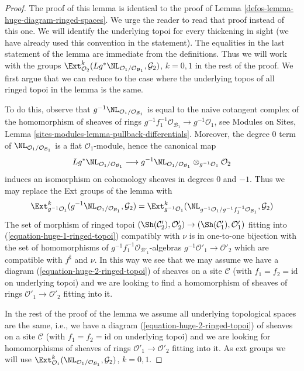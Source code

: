 \begin{proof}

The proof of this lemma is identical to the proof of
Lemma \ref{defos-lemma-huge-diagram-ringed-spaces}.
We urge the reader to read that proof instead of this one.
We will identify the underlying topoi for every
thickening in sight (we have already used this convention
in the statement). The equalities in the last statement of the
lemma are immediate from the definitions. Thus we will work with the groups
$\Ext^k_{\mathcal{O}_2}(
Lg^*\NL_{\mathcal{O}_1/\mathcal{O}_{\mathcal{B}_1}}, \mathcal{G}_2)$,
$k = 0, 1$ in the rest of the proof. We first argue that we can reduce
to the case where the underlying topos of all ringed topoi in the lemma
is the same.

\medskip\noindent
To do this, observe that
$g^{-1}\NL_{\mathcal{O}_1/\mathcal{O}_{\mathcal{B}_1}}$ is equal to the naive
cotangent complex of the homomorphism of sheaves of rings
$g^{-1}f_1^{-1}\mathcal{O}_{\mathcal{B}_1} \to g^{-1}\mathcal{O}_1$, see
Modules on Sites, Lemma \ref{sites-modules-lemma-pullback-differentials}.
Moreover, the degree $0$ term of
$\NL_{\mathcal{O}_1/\mathcal{O}_{\mathcal{B}_1}}$ is a flat
$\mathcal{O}_1$-module, hence the canonical map
$$
Lg^*\NL_{\mathcal{O}_1/\mathcal{O}_{\mathcal{B}_1}}
\longrightarrow
g^{-1}\NL_{\mathcal{O}_1/\mathcal{O}_{\mathcal{B}_1}}
\otimes_{g^{-1}\mathcal{O}_1} \mathcal{O}_2
$$
induces an isomorphism on cohomology sheaves in degrees $0$ and $-1$.
Thus we may replace the Ext groups of the lemma with
$$
\Ext^k_{g^{-1}\mathcal{O}_1}(
g^{-1}\NL_{\mathcal{O}_1/\mathcal{O}_{\mathcal{B}_1}}, \mathcal{G}_2) =
\Ext^k_{g^{-1}\mathcal{O}_1}(
\NL_{g^{-1}\mathcal{O}_1/g^{-1}f_1^{-1}\mathcal{O}_{\mathcal{B}_1}},
\mathcal{G}_2)
$$
The set of morphism of ringed topoi
$(\Sh(\mathcal{C}'_2), \mathcal{O}'_2) \to
(\Sh(\mathcal{C}'_1), \mathcal{O}'_1)$ fitting into
(\ref{equation-huge-1-ringed-topoi}) compatibly with $\nu$ is in
one-to-one bijection with the set of homomorphisms of
$g^{-1}f_1^{-1}\mathcal{O}_{\mathcal{B}'_1}$-algebras
$g^{-1}\mathcal{O}'_1 \to \mathcal{O}'_2$ which are compatible with
$f^\sharp$ and $\nu$. In this way we see that we may assume we have a
diagram (\ref{equation-huge-2-ringed-topoi}) of sheaves on a site
$\mathcal{C}$ (with $f_1 = f_2 = \text{id}$ on underlying topoi)
and we are looking to find a homomorphism of sheaves of rings
$\mathcal{O}'_1 \to \mathcal{O}'_2$ fitting into it.

\medskip\noindent
In the rest of the proof of the lemma we assume
all underlying topological spaces are the
same, i.e., we have a diagram (\ref{equation-huge-2-ringed-topoi})
of sheaves on a site $\mathcal{C}$ (with $f_1 = f_2 = \text{id}$
on underlying topoi) and we are looking for
homomorphisms of sheaves of rings
$\mathcal{O}'_1 \to \mathcal{O}'_2$ fitting into it.
As ext groups we will use
$\Ext^k_{\mathcal{O}_1}(
\NL_{\mathcal{O}_1/\mathcal{O}_{\mathcal{B}_1}}, \mathcal{G}_2)$, $k = 0, 1$.


\end{proof}
